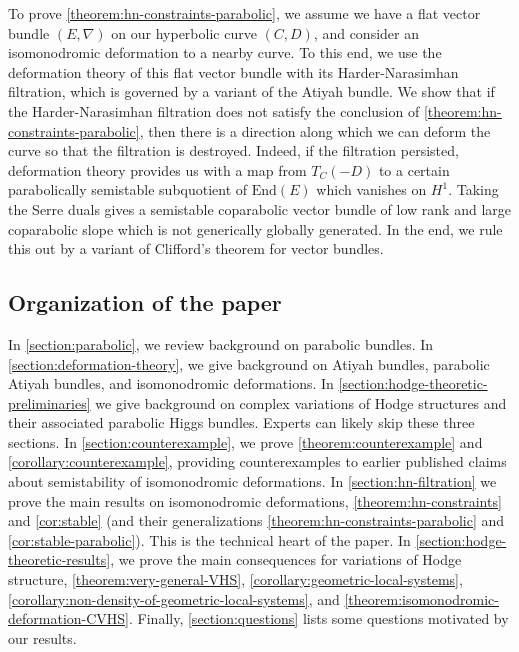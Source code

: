 To prove \autoref{theorem:hn-constraints-parabolic}, we assume we have a flat
vector bundle $(E, \nabla)$ on our hyperbolic curve $(C, D)$, and consider an
isomonodromic deformation to a nearby curve.
To this end, we use the deformation theory of this flat vector bundle with its Harder-Narasimhan filtration,
which is governed by a variant of the Atiyah bundle.
We show that if the Harder-Narasimhan filtration does not satisfy the conclusion of \autoref{theorem:hn-constraints-parabolic}, then there is a direction along which we can deform the curve so that
the filtration is destroyed.
Indeed, if the filtration persisted, deformation theory provides us with a map
from $T_C(-D)$ to a certain
parabolically semistable subquotient of $\mathrm{End}(E)$ which vanishes on $H^1$.
Taking the Serre duals gives a semistable coparabolic vector bundle of low rank
and large coparabolic slope
which is not generically globally generated.
In the end, we rule this out by a variant of Clifford's theorem for vector
bundles.


\subsection{Organization of the paper}
\label{subsection:organization}
In \autoref{section:parabolic}, we review background on parabolic bundles.
In \autoref{section:deformation-theory}, we give background on Atiyah bundles,
parabolic Atiyah bundles, and isomonodromic deformations.
In \autoref{section:hodge-theoretic-preliminaries} we give background on complex variations of Hodge structures and their associated parabolic Higgs bundles. Experts can likely skip these three sections.
In \autoref{section:counterexample}, we prove \autoref{theorem:counterexample} and \autoref{corollary:counterexample}, providing counterexamples to earlier published claims about semistability of isomonodromic deformations.
In \autoref{section:hn-filtration} we prove the main results on isomonodromic
deformations, \autoref{theorem:hn-constraints} and \autoref{cor:stable} (and their generalizations \autoref{theorem:hn-constraints-parabolic} and \autoref{cor:stable-parabolic}). This is the technical heart of the paper.
In \autoref{section:hodge-theoretic-results}, we prove the main consequences for
variations of Hodge structure, \autoref{theorem:very-general-VHS}, \autoref{corollary:geometric-local-systems}, \autoref{corollary:non-density-of-geometric-local-systems}, and \autoref{theorem:isomonodromic-deformation-CVHS}.
Finally, \autoref{section:questions} lists some questions motivated by our results.

